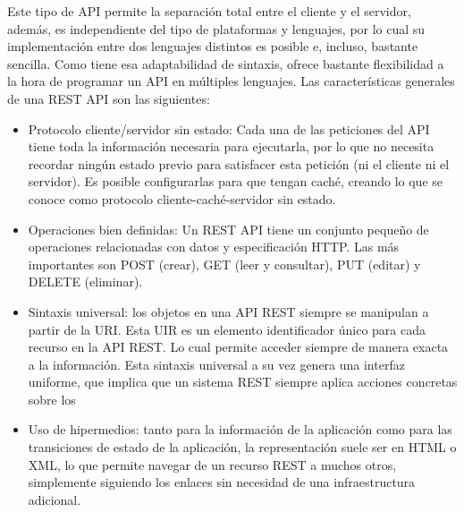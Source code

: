 Este tipo de API permite la separación total entre el cliente y el servidor, además, es independiente del tipo de plataformas y lenguajes, por lo cual su implementación entre dos lenguajes distintos es posible e, incluso, bastante sencilla. Como tiene esa adaptabilidad de sintaxis, ofrece bastante flexibilidad a la hora de programar un API en múltiples lenguajes. 
Las características generales de una REST API son las siguientes:\cite{api2}
\begin{itemize}
\item Protocolo cliente/servidor sin estado: Cada una de las peticiones del API tiene toda la información necesaria para ejecutarla, por lo que no necesita recordar ningún estado previo para satisfacer esta petición (ni el cliente ni el servidor). Es posible configurarlas para que tengan caché, creando lo que se conoce como protocolo cliente-caché-servidor sin estado.
\item Operaciones bien definidas: Un REST API tiene un conjunto pequeño de operaciones relacionadas con datos y especificación HTTP. Las más importantes son POST (crear), GET (leer y consultar), PUT (editar) y DELETE (eliminar).
\item Sintaxis universal: los objetos en una API REST siempre se manipulan a partir de la URI.  Esta UIR es un elemento identificador único para cada recurso en la API REST. Lo cual permite acceder siempre de manera exacta a la información. Esta sintaxis universal a su vez genera una interfaz uniforme, que implica que un sistema REST siempre aplica acciones concretas sobre los \item Uso de hipermedios: tanto para la información de la aplicación como para las transiciones de estado de la aplicación, la representación suele ser en HTML o XML, lo que permite navegar de un recurso REST a muchos otros, simplemente siguiendo los enlaces sin necesidad de una infraestructura adicional.
\end{itemize}


